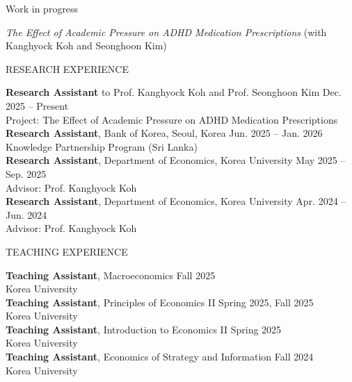 \documentclass{resume} %
\begin{document}
\begin{rSection}{Work in progress}

\textit{The Effect of Academic Pressure on ADHD Medication Prescriptions} (with Kanghyock Koh and Seonghoon Kim)

\end{rSection}


\begin{rSection}{RESEARCH EXPERIENCE}

\textbf{Research Assistant} to Prof. Kanghyock Koh and Prof. Seonghoon Kim \hfill Dec. 2025 -- Present \\
Project: The Effect of Academic Pressure on ADHD Medication Prescriptions \\
\textbf{Research Assistant}, Bank of Korea, Seoul, Korea \hfill Jun. 2025 -- Jan. 2026 \\
Knowledge Partnership Program (Sri Lanka) \\
\textbf{Research Assistant}, Department of Economics, Korea University \hfill May 2025 -- Sep. 2025 \\
Advisor: Prof. Kanghyock Koh \\
\textbf{Research Assistant}, Department of Economics, Korea University \hfill Apr. 2024 -- Jun. 2024 \\
Advisor: Prof. Kanghyock Koh

\end{rSection}


\begin{rSection}{TEACHING EXPERIENCE}

\textbf{Teaching Assistant}, Macroeconomics \hfill Fall 2025 \\
Korea University \\
\textbf{Teaching Assistant}, Principles of Economics II \hfill Spring 2025, Fall 2025 \\
Korea University \\
\textbf{Teaching Assistant}, Introduction to Economics II \hfill Spring 2025 \\
Korea University \\
\textbf{Teaching Assistant}, Economics of Strategy and Information \hfill Fall 2024 \\
Korea University

\end{rSection}
\end{document}
